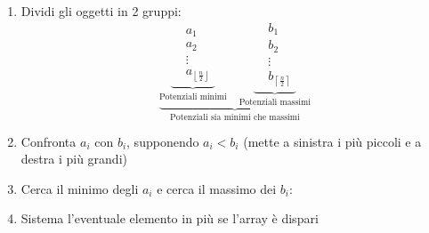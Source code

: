 \documentclass[a4paper]{article}
\begin{document}
\begin{enumerate}
  \item Dividi gli oggetti in 2 gruppi:
    \[
      \underbrace{
        \underbrace{
          \begin{aligned}
          &a_1\\
          &a_2\\
          &\vdots\\
          &a_{\left\lfloor \frac{n}{2} \right\rfloor}
          \end{aligned}
        }_{\text{Potenziali minimi}}
        \quad
        \underbrace{
          \begin{aligned}
        &b_1\\
        &b_2\\
        &\vdots\\
        &b_{\left\lceil \frac{n}{2} \right\rceil}
          \end{aligned}
        }_{\text{Potenziali massimi}}
      }_{\text{Potenziali sia minimi che massimi}}
    \] 

  \item Confronta \( a_i \) con \( b_i \), supponendo \( a_i < b_i \) (mette a sinistra
    i più piccoli e a destra i più grandi)

  \item Cerca il minimo degli \( a_i \) e cerca il massimo dei \( b_i \):

  \item Sistema l'eventuale elemento in più se l'array è dispari
\end{enumerate}
\end{document}
